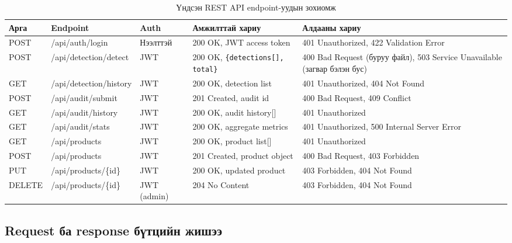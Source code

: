 \begin{longtable}{|p{1.4cm}|p{3.2cm}|p{2.2cm}|p{2.5cm}|p{3.9cm}|}
\caption{Үндсэн REST API endpoint-уудын зохиомж}
\label{tab:api_endpoints} \\
\hline
\textbf{Арга} & \textbf{Endpoint} & \textbf{Auth} & \textbf{Амжилттай хариу} & \textbf{Алдааны хариу} \\
\hline
POST & /api/auth/login & Нээлттэй & 200 OK, JWT access token & 401 Unauthorized, 422 Validation Error \\
\hline
POST & /api/detection/detect & JWT & 200 OK, \texttt{\{detections[], total\}} & 400 Bad Request (буруу файл), 503 Service Unavailable (загвар бэлэн бус) \\
\hline
GET & /api/detection/history & JWT & 200 OK, detection list & 401 Unauthorized, 404 Not Found \\
\hline
POST & /api/audit/submit & JWT & 201 Created, audit id & 400 Bad Request, 409 Conflict \\
\hline
GET & /api/audit/history & JWT & 200 OK, audit history[] & 401 Unauthorized \\
\hline
GET & /api/audit/stats & JWT & 200 OK, aggregate metrics & 401 Unauthorized, 500 Internal Server Error \\
\hline
GET & /api/products & JWT & 200 OK, product list[] & 401 Unauthorized \\
\hline
POST & /api/products & JWT  & 201 Created, product object & 400 Bad Request, 403 Forbidden \\
\hline
PUT & /api/products/\{id\} & JWT & 200 OK, updated product & 403 Forbidden, 404 Not Found \\
\hline
DELETE & /api/products/\{id\} & JWT (admin) & 204 No Content & 403 Forbidden, 404 Not Found \\
\hline
\end{longtable}

\subsection{Request ба response бүтцийн жишээ}


